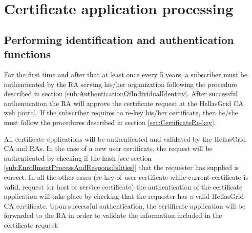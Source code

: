 % 
% 

\section{Certificate application processing}
\subsection{Performing identification and authentication functions}
\label{sub:PerfomingIdentificationAndAuthenticationFunctions}

% 
% 

For the first time and after that at least once every 5 years, a subscriber must be authenticated by the RA serving his/her organization following the procedure described in section \ref{sub:AuthenticationOfIndividualIdentity}. After successful authentication the RA will approve the certificate request at the HellasGrid CA web portal. If the subscriber requires to re-key his/her certificate, then he/she must follow the procedures described in section \ref{sec:CertificateRe-key}.

All certificate applications will be authenticated and validated by the HellasGrid CA and RAs. In the case of a new user certificate, the request will be authenticated by checking if the hash [see section \ref{sub:EnrollmentProcessAndResponsibilities}] that the requester has supplied is correct. In all the other cases (re-key of user certificate while current certificate is valid, request for host or service certificate) the authentication of the certificate application will take place by checking that the requester has a valid HellasGrid CA certificate. Upon successful authentication, the certificate application will be forwarded to the RA in order to validate the information included in the certificate request.


